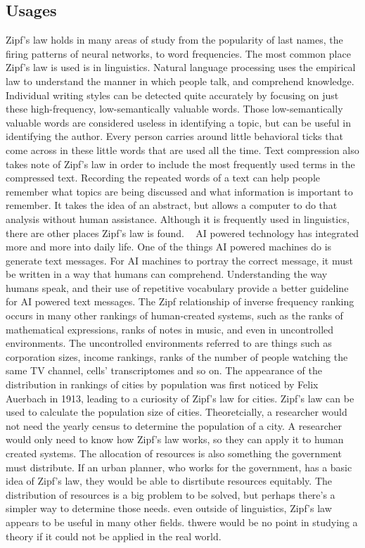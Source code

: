 \documentclass[a4paper,10pt]{article}
\begin{document}
	

\subsection{Usages}

Zipf's law holds in many areas of study from the popularity of last names, the firing patterns of neural networks, to word frequencies. The most common place Zipf's law is used is in linguistics. Natural language processing uses the empirical law to understand the manner in which people talk, and comprehend knowledge. Individual writing styles can be detected quite accurately by focusing on just these high-frequency, low-semantically valuable words. Those low-semantically valuable words are considered useless in identifying a topic, but can be useful in identifying the author. Every person carries around little behavioral ticks that come across in these little words that are used all the time.  Text compression also takes note of Zipf's law in order to include the most frequently used terms in the compressed text. Recording the repeated words of a text can help people remember what topics are being discussed and what information is important to remember. It takes the idea of an abstract, but allows a computer to do that analysis without human assistance. Although it is frequently used in linguistics, there are other places Zipf's law is found.  
AI powered technology has integrated more and more into daily life. One of the things AI powered machines do is generate text messages. For AI machines to portray the correct message, it must be written in a way that humans can comprehend. Understanding the way humans speak, and their use of repetitive vocabulary provide a better guideline for AI powered text messages. 
The Zipf relationship of inverse frequency ranking occurs in many other rankings of human-created systems, such as the ranks of mathematical expressions, ranks of notes in music, and even in uncontrolled environments. The uncontrolled environments referred to are things such as corporation sizes, income rankings, ranks of the number of people watching the same TV channel, cells' transcriptomes  and so on. The appearance of the distribution in rankings of cities by population was first noticed by Felix Auerbach in 1913, leading to a curiosity of Zipf's law for cities. Zipf's law can be used to calculate the population size of cities. Theoretcially, a researcher would not need the yearly census to determine the population of a city. A researcher would only need to know how Zipf's law works, so they can apply it to human created systems. 
The allocation of resources is also something the government must distribute. If an urban planner, who works for the government, has a basic idea of Zipf's law, they would be able to disrtibute resources equitably. The distribution of resources is a big problem to be solved, but perhaps there's a simpler way to determine those needs. even outside of linguistics, Zipf's law appears to be useful in many other fields. thwere would be no point in studying a theory if it could not be applied in the real world.
	
\end{document}
